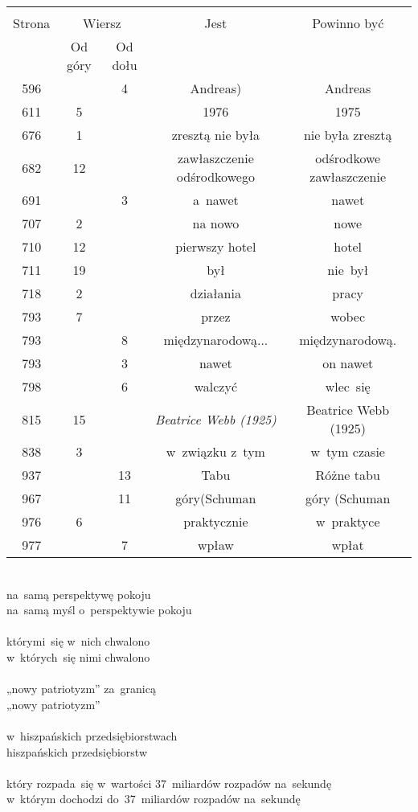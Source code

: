 \documentclass[a4paper,11pt]{article}
\begin{document}
\begin{center}
  \begin{tabular}{|c|c|c|c|c|}
    \hline
    & \multicolumn{2}{c|}{} & & \\
    Strona & \multicolumn{2}{c|}{Wiersz} & Jest
                              & Powinno być \\ \cline{2-3}
    & Od góry & Od dołu & & \\
    \hline
    596 & &  4 & Andreas) & Andreas \\
    611 &  5 & & 1976 & 1975 \\
    676 &  1 & & zresztą nie była & nie była zresztą \\
    682 & 12 & & zawłaszczenie odśrodkowego & odśrodkowe zawłaszczenie \\
    691 & &  3 & a~nawet & nawet \\
    707 &  2 & & na nowo & nowe \\
    710 & 12 & & pierwszy hotel & hotel \\
    711 & 19 & & był & nie~był \\
    718 &  2 & & działania & pracy \\
    793 &  7 & & przez & wobec \\
    793 & &  8 & międzynarodową... & międzynarodową. \\
    793 & &  3 & nawet & on nawet \\
    798 & &  6 & walczyć & wlec~się \\
    815 & 15 & & \textit{Beatrice Webb (1925)} & Beatrice Webb (1925) \\
    838 &  3 & & w~związku z~tym & w~tym czasie \\
    937 & & 13 & Tabu & Różne tabu \\
    967 & & 11 & góry(Schuman & góry (Schuman \\
    976 &  6 & & praktycznie & w~praktyce \\
    977 & &  7 & wpław & wpłat \\
    \hline
  \end{tabular}

\end{center}


\noindent
{} \\
\Jest  na~samą perspektywę pokoju \\
\Powin na~samą myśl o~perspektywie pokoju \\
 \\
\Jest  którymi~się w~nich chwalono \\
\Powin w~których~się nimi chwalono \\
 \\
\Jest  „nowy patriotyzm” za~granicą \\
\Powin „nowy patriotyzm” \\
 \\
\Jest  w~hiszpańskich przedsiębiorstwach \\
\Powin hiszpańskich przedsiębiorstw \\
 \\
\Jest  który rozpada~się w~wartości 37~miliardów rozpadów na~sekundę \\
\Powin w~którym dochodzi do~37~miliardów rozpadów na~sekundę \\
\end{document}
